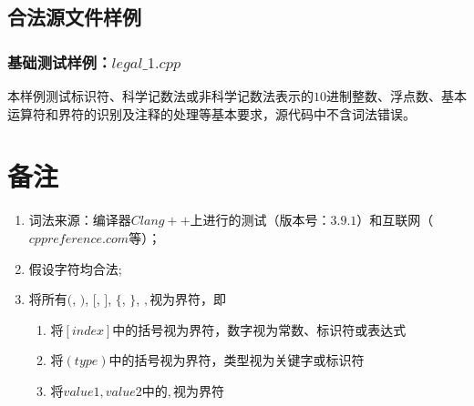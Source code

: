 \documentclass[UTF8]{ctexart}
\begin{document}
\subsection{合法源文件样例}
\subsubsection{基础测试样例：$legal\_1.cpp$}
本样例测试标识符、科学记数法或非科学记数法表示的$10$进制整数、浮点数、基本运算符和界符的识别及注释的处理等基本要求，源代码中不含词法错误。
\section{备注}
\begin{enumerate}
	\item 词法来源：编译器$Clang++$上进行的测试（版本号：$3.9.1$）和互联网（$cppreference.com$等）；
	\item 假设字符均合法;
	\item 将所有$($, $)$, $[$, $]$, $\{$, $\}$, $,$视为界符，即
	      \begin{enumerate}
		      \item 将$[index]$中的括号视为界符，数字视为常数、标识符或表达式
		      \item 将$(type)$中的括号视为界符，类型视为关键字或标识符
		      \item 将${value1, value2}$中的$,$视为界符
	      \end{enumerate}
\end{enumerate}
\end{document}
